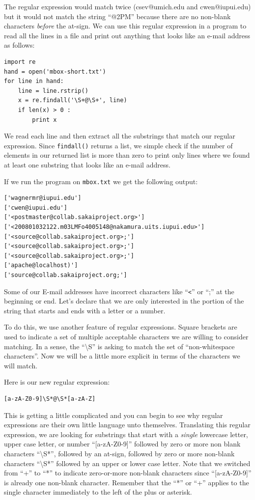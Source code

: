 \documentclass[10pt]{book}
\begin{document}
The regular expression would match twice (csev@umich.edu and cwen@iupui.edu) but it would not match the string ``@2PM'' because there are no non-blank characters {\em before} the at-sign.  
We can use this regular expression in a program to read all the lines in a file and print out anything that looks like an e-mail address as follows:

\beforeverb
\begin{verbatim}
import re
hand = open('mbox-short.txt')
for line in hand:
    line = line.rstrip()
    x = re.findall('\S+@\S+', line)
    if len(x) > 0 :
        print x
\end{verbatim}
\afterverb
%
We read each line and then extract all the substrings that match our regular expression.  Since {\tt findall()} returns a list, we simple check if the number of elements in our returned list is more than zero to print only lines where we found at least one substring that looks like an e-mail address.

If we run the program on {\tt mbox.txt} we get the following output:

\beforeverb
\begin{verbatim}
['wagnermr@iupui.edu']
['cwen@iupui.edu']
['<postmaster@collab.sakaiproject.org>']
['<200801032122.m03LMFo4005148@nakamura.uits.iupui.edu>']
['<source@collab.sakaiproject.org>;']
['<source@collab.sakaiproject.org>;']
['<source@collab.sakaiproject.org>;']
['apache@localhost)']
['source@collab.sakaiproject.org;']
\end{verbatim}
\afterverb
%
Some of our E-mail addresses have incorrect characters like ``\verb"<"'' or ``;'' at the beginning or end.   Let's declare that we are only interested in the portion of the string that starts and ends with a letter or a number.

To do this, we use another feature of regular expressions.  Square brackets are used to indicate a set of multiple acceptable characters we are willing to consider matching.  In a sense, the ``{\textbackslash}S'' is asking to match the set of ``non-whitespace characters''.  Now we will be a little more explicit in terms of the characters we will match.

Here is our new regular expression:

\beforeverb
\begin{verbatim}
[a-zA-Z0-9]\S*@\S*[a-zA-Z]
\end{verbatim}
\afterverb
%
This is getting a little complicated and you can begin to see why regular expressions are their own little language unto themselves.  Translating this regular expression, we are looking for substrings that start with a {\em single} lowercase letter, upper case letter, or number ``[a-zA-Z0-9]'' followed by zero or more non blank characters ``{\textbackslash}S*'', followed by an at-sign, followed by zero or more non-blank characters ``{\textbackslash}S*'' followed by an upper or lower case letter.  Note that we switched from ``+'' to ``*'' to indicate zero-or-more non-blank characters since ``[a-zA-Z0-9]'' is already one non-blank character.   Remember that the ``*'' or ``+'' applies to the single character immediately to the left of the plus or asterisk.
\end{document}
